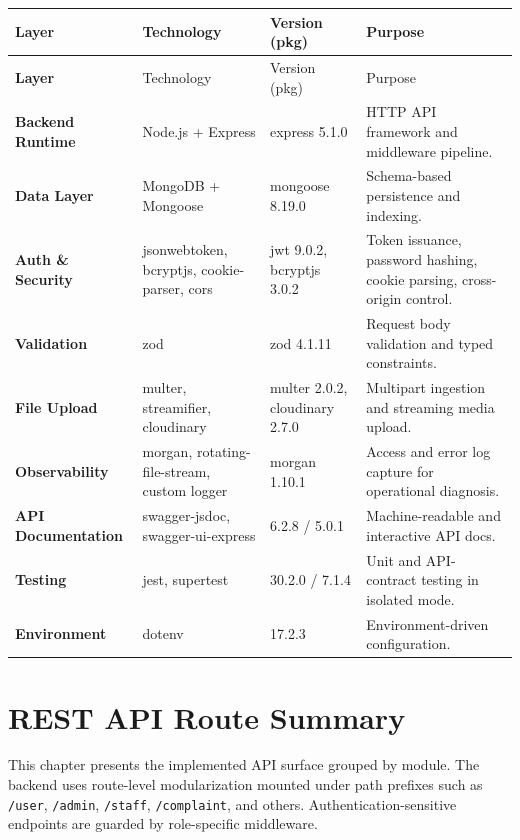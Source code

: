 \documentclass[12pt,a4paper]{report}
\begin{document}
\begin{longtable}{>{\bfseries}p{} p{} p{} p{}}
\toprule
\rowcolor{TableHeader}
\textcolor{TableHeaderText}{Layer} & \textcolor{TableHeaderText}{Technology} & \textcolor{TableHeaderText}{Version (pkg)} & \textcolor{TableHeaderText}{Purpose} \\
\midrule
\endfirsthead
\toprule
\rowcolor{TableHeader}
\textcolor{TableHeaderText}{Layer} & \textcolor{TableHeaderText}{Technology} & \textcolor{TableHeaderText}{Version (pkg)} & \textcolor{TableHeaderText}{Purpose} \\
\midrule
\endhead
Backend Runtime & Node.js + Express & express 5.1.0 & HTTP API framework and middleware pipeline. \\
Data Layer & MongoDB + Mongoose & mongoose 8.19.0 & Schema-based persistence and indexing. \\
Auth \& Security & jsonwebtoken, bcryptjs, cookie-parser, cors & jwt 9.0.2, bcryptjs 3.0.2 & Token issuance, password hashing, cookie parsing, cross-origin control. \\
Validation & zod & zod 4.1.11 & Request body validation and typed constraints. \\
File Upload & multer, streamifier, cloudinary & multer 2.0.2, cloudinary 2.7.0 & Multipart ingestion and streaming media upload. \\
Observability & morgan, rotating-file-stream, custom logger & morgan 1.10.1 & Access and error log capture for operational diagnosis. \\
API Documentation & swagger-jsdoc, swagger-ui-express & 6.2.8 / 5.0.1 & Machine-readable and interactive API docs. \\
Testing & jest, supertest & 30.2.0 / 7.1.4 & Unit and API-contract testing in isolated mode. \\
Environment & dotenv & 17.2.3 & Environment-driven configuration. \\
\bottomrule
\end{longtable}

\chapter{REST API Route Summary}

This chapter presents the implemented API surface grouped by module. The backend uses route-level modularization mounted under path prefixes such as \texttt{/user}, \texttt{/admin}, \texttt{/staff}, \texttt{/complaint}, and others. Authentication-sensitive endpoints are guarded by role-specific middleware.
\end{document}
